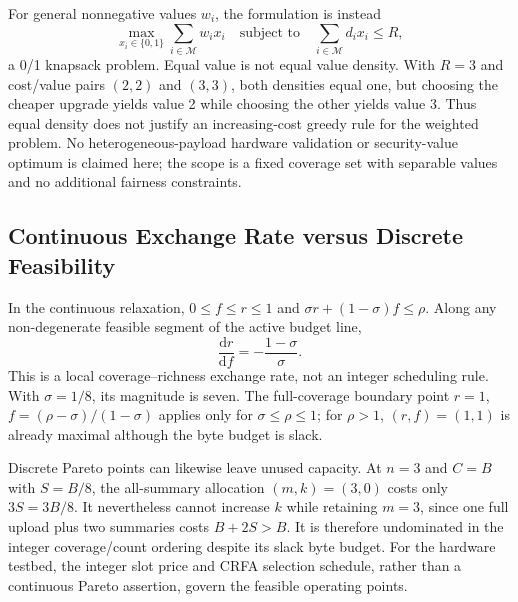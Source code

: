 \documentclass[10pt,onecolumn]{IEEEtran}
\begin{document}
For general nonnegative values $w_i$, the formulation is instead
\begin{equation}
\max_{x_i\in\{0,1\}}\sum_{i\in\mathcal M}w_i x_i
\quad\text{subject to}\quad
\sum_{i\in\mathcal M}d_i x_i\leq R,
\label{eq:supp_knapsack}
\end{equation}
a 0/1 knapsack problem. Equal value is not equal value density. With
$R=3$ and cost/value pairs $(2,2)$ and $(3,3)$, both densities equal one,
but choosing the cheaper upgrade yields value 2 while choosing the other
yields value 3. Thus equal density does not justify an increasing-cost greedy
rule for the weighted problem. No heterogeneous-payload hardware validation
or security-value optimum is claimed here; the scope is a fixed coverage set
with separable values and no additional fairness constraints.

\subsection{Continuous Exchange Rate versus Discrete Feasibility}
\label{sec:supp_continuous}
In the continuous relaxation, $0\leq f\leq r\leq1$ and
$\sigma r+(1-\sigma)f\leq\rho$. Along any non-degenerate feasible segment
of the active budget line,
\begin{equation}
\frac{\mathrm dr}{\mathrm df}=-\frac{1-\sigma}{\sigma}.
\label{eq:supp_exchange_rate}
\end{equation}
This is a local coverage--richness exchange rate, not an integer scheduling
rule. With $\sigma=1/8$, its magnitude is seven. The full-coverage boundary
point $r=1$, $f=(\rho-\sigma)/(1-\sigma)$ applies only for
$\sigma\leq\rho\leq1$; for $\rho>1$, $(r,f)=(1,1)$ is already maximal
although the byte budget is slack.

Discrete Pareto points can likewise leave unused capacity. At $n=3$ and
$C=B$ with $S=B/8$, the all-summary allocation $(m,k)=(3,0)$ costs only
$3S=3B/8$. It nevertheless cannot increase $k$ while retaining $m=3$,
since one full upload plus two summaries costs $B+2S>B$. It is therefore
undominated in the integer coverage/count ordering despite its slack byte
budget. For the hardware testbed, the integer slot price and CRFA selection
schedule, rather than a continuous Pareto assertion, govern the feasible
operating points.
\end{document}
